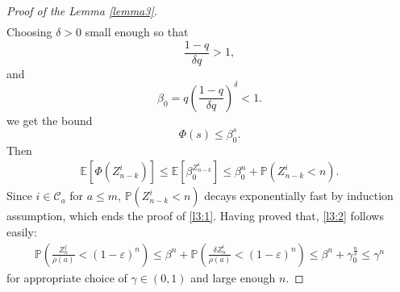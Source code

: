 \documentclass[12pt]{article}
\numberwithin{equation}{section}
\begin{document}
\begin{proof}[Proof of the Lemma \ref{lemma3}]
\begin{align*}
 \end{align*}
 Choosing $\delta > 0$ small enough so that \[
 \frac {1-q} {\delta q} > 1,\] and \[
 \beta_0 = q \left(\frac {1-q} {\delta q}\right)^{\delta} < 1.
 \]we get the bound 
 \[
 \Phi(s) \leq \beta_0^s.
 \]
Then 
     \begin{align*}
    \mathbb{E} \left[\Phi\left(Z_{n-k}^i\right)\right] \leq \mathbb{E}\left[\beta_0^{Z_{n-k}^i} \right] \leq \beta_0^n + \mathbb{P}\left(Z_{n-k}^i< n\right).
    \end{align*}
    Since $i \in \mathcal{C}_a$ for $a \leq m$, $\mathbb{P}\left(Z_{n-k}^i< n\right)$ decays exponentially fast by induction assumption, which ends the proof of \eqref{l3:1}. Having proved that, \eqref{l3:2} follows easily:
    \begin{align*}
        \mathbb{P}\left(\frac {Z_{n}^j} {\rho(a)}< (1-\varepsilon)^n\right) \leq \beta^n + \mathbb{P}\left(\frac {\delta Z_{n}^i} {\rho(a)}< (1-\varepsilon)^n\right)  \leq \beta^n + \gamma_0^{\frac n {\delta}} \leq \gamma^n
    \end{align*}
    for appropriate choice of $\gamma \in (0,1)$ and large enough $n$.
    \end{proof}    
\end{document}
